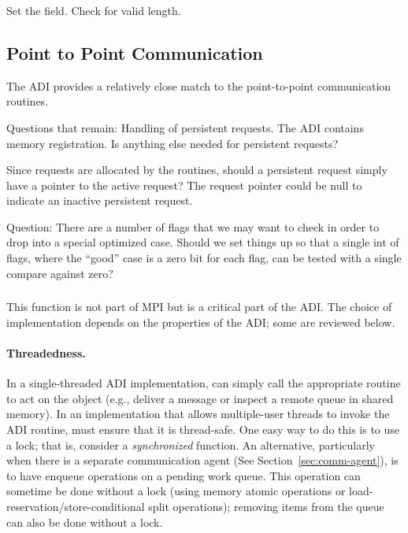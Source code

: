 \documentclass{article}
\begin{document}
\subsubsection{}
Set the  field.  Check for valid length.

\subsection{Point to Point Communication}
\label{sec:pt-2-pt}

The ADI provides a relatively close match to the point-to-point
communication routines.  

Questions that remain:  Handling of persistent requests.  The ADI
contains memory registration.  Is anything else needed for persistent
requests? 

Since requests are allocated by the  routines,
should a persistent request simply have a pointer to the active request?  The
request pointer could be null to indicate an inactive persistent request.

Question:  There are a number of flags that we may want to check in order to
drop into a special optimized case.  Should we set things up so that a single
int of flags, where the ``good'' case is a zero bit for each flag, can be
tested with a single compare against zero?



\subsubsection{}
This function is not part of MPI but is a critical part of the ADI.
The choice of implementation depends on the properties of the ADI;
some are reviewed below.

\paragraph{Threadedness.}In a single-threaded ADI
implementation, 
 can simply call the appropriate routine to act on
the object (e.g., deliver a message or inspect a remote queue in
shared memory).  In an implementation that allows multiple-user
threads to invoke the ADI routine,  must ensure
that it is thread-safe.  One easy way to do this is to use a lock;
that is, consider  a \emph{synchronized}
function.  An alternative, particularly when there is a separate
communication agent (See Section~\ref{sec:comm-agent}), is to have
 enqueue operations on a pending work queue.  This
operation can sometime be done without a lock (using memory atomic
operations or load-reservation/store-conditional split operations);
removing items from the queue can also be done without a lock.
\end{document}
